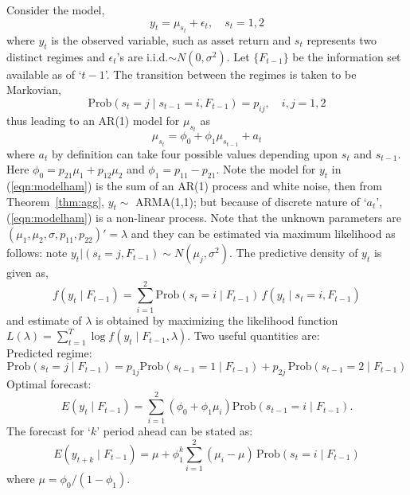 Consider the model,
	\begin{equation}\label{eqn:modelham}
	y_t = \mu_{s_t} + \epsilon_t, \quad s_t=1,2
	\end{equation} 
where $y_t$ is the observed variable, such as asset return and $s_t$ represents two distinct regimes and $\epsilon_t$'s are i.i.d.$\sim N(0,\sigma^2)$. Let $\{F_{t-1}\}$ be the information set available as of `$t-1$'. The transition between the regimes is taken to be Markovian,
	\begin{equation}\label{eqn:markprob}
	\text{Prob}(s_t=j \;|\; s_{t-1}=i, F_{t-1})= p_{ij}, \quad i,j=1,2
	\end{equation}
thus leading to an AR(1) model for $\mu_{s_t}$ as
	\begin{equation}\label{eqn:must}
	\mu_{s_t} = \phi_0 + \phi_1 \mu_{s_{t-1}} + a_t
	\end{equation}
where $a_t$ by definition can take four possible values depending upon $s_t$ and $s_{t-1}$. Here $\phi_0=p_{21}\mu_1 + p_{12} \mu_2$ and $\phi_1=p_{11}-p_{21}$. Note the model for $y_t$ in (\ref{eqn:modelham}) is the sum of an AR(1) process and white noise, then from Theorem~\ref{thm:agg}, $y_t \sim$ ARMA(1,1); but because of discrete nature of `$a_t$', (\ref{eqn:modelham}) is a non-linear process. Note that the unknown parameters are $(\mu_1,\mu_2,\sigma,p_{11},p_{22})'=\lambda$ and they can be estimated via maximum likelihood as follows: note $y_t|(s_t=j,F_{t-1})\sim N(\mu_j,\sigma^2)$. The predictive density of $y_t$ is given as,
	\begin{equation}\label{eqn:predden}
	f(y_t \;|\; F_{t-1})= \sum_{i=1}^2 \text{Prob}(s_t=i \;|\; F_{t-1}) \, f(y_t \;|\; s_t=i, F_{t-1})
	\end{equation}
and estimate of $\lambda$ is obtained by maximizing the likelihood function $L(\lambda)=\sum_{t=1}^T \log f(y_t \;|\; F_{t-1}, \lambda)$. Two useful quantities are: \\


\noindent Predicted regime: 
	\begin{equation}\label{eqn:predreg}
	\text{Prob}(s_t=j \;|\; F_{t-1})= p_{1j} \text{Prob}(s_{t-1}=1 \;|\; F_{t-1}) + p_{2j} \,\text{Prob}(s_{t-1}=2 \;|\; F_{t-1})
	\end{equation}
\noindent Optimal forecast:
	\begin{equation}\label{eqn:optfore}
	E(y_t \;|\; F_{t-1})= \sum_{i=1}^2 (\phi_0+\phi_1 \mu_i) \text{Prob}(s_{t-1}=i \;|\; F_{t-1}).
	\end{equation}
The forecast for `$k$' period ahead can be stated as:
	\begin{equation}\label{eqn:period}
	E(y_{t+k} \;|\; F_{t-1}) = \mu+\phi_1^k \sum_{i=1}^2 (\mu_i-\mu)\, \text{Prob}(s_t=i \;|\; F_{t-1})
	\end{equation}
where $\mu=\phi_0/(1-\phi_1)$.



